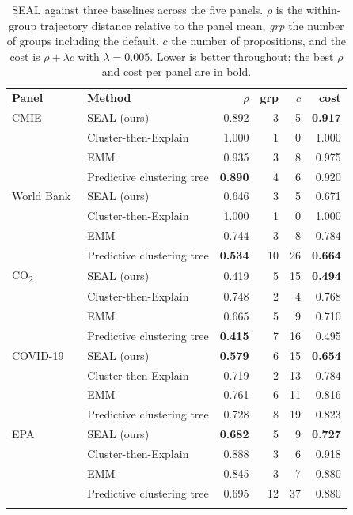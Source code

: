 \documentclass[runningheads]{llncs}
\begin{document}
\begin{table}[t]
\caption{\textsc{SEAL} against three baselines across the five panels. $\rho$ is the within-group trajectory distance relative to the panel mean, \emph{grp} the number of groups including the default, $c$ the number of propositions, and the cost is $\rho + \lambda c$ with $\lambda = 0.005$. Lower is better throughout; the best $\rho$ and cost per panel are in bold.}
\label{tab:baselines}
\centering
\footnotesize
\begin{tabular}{llrrrr}
\hline\noalign{\smallskip}
\textbf{Panel} & \textbf{Method} & $\rho$ & \textbf{grp} & $c$ & \textbf{cost} \\
\noalign{\smallskip}\hline\noalign{\smallskip}
CMIE~\citep{cmie}
  & \textsc{SEAL} (ours)        & 0.892 & 3  & 5  & \textbf{0.917} \\
  & Cluster-then-Explain        & 1.000 & 1  & 0  & 1.000 \\
  & EMM                         & 0.935 & 3  & 8  & 0.975 \\
  & Predictive clustering tree  & \textbf{0.890} & 4  & 6  & 0.920 \\
\noalign{\smallskip}\hline\noalign{\smallskip}
World Bank~\citep{worldbankwdi}
  & \textsc{SEAL} (ours)        & 0.646 & 3  & 5  & 0.671 \\
  & Cluster-then-Explain        & 1.000 & 1  & 0  & 1.000 \\
  & EMM                         & 0.744 & 3  & 8  & 0.784 \\
  & Predictive clustering tree  & \textbf{0.534} & 10 & 26 & \textbf{0.664} \\
\noalign{\smallskip}\hline\noalign{\smallskip}
CO\textsubscript{2}~\citep{owidco2}
  & \textsc{SEAL} (ours)        & 0.419 & 5  & 15 & \textbf{0.494} \\
  & Cluster-then-Explain        & 0.748 & 2  & 4  & 0.768 \\
  & EMM                         & 0.665 & 5  & 9  & 0.710 \\
  & Predictive clustering tree  & \textbf{0.415} & 7  & 16 & 0.495 \\
\noalign{\smallskip}\hline\noalign{\smallskip}
COVID-19~\citep{owidcovid}
  & \textsc{SEAL} (ours)        & \textbf{0.579} & 6  & 15 & \textbf{0.654} \\
  & Cluster-then-Explain        & 0.719 & 2  & 13 & 0.784 \\
  & EMM                         & 0.761 & 6  & 11 & 0.816 \\
  & Predictive clustering tree  & 0.728 & 8  & 19 & 0.823 \\
\noalign{\smallskip}\hline\noalign{\smallskip}
EPA~\citep{epaairdata}
  & \textsc{SEAL} (ours)        & \textbf{0.682} & 5  & 9  & \textbf{0.727} \\
  & Cluster-then-Explain        & 0.888 & 3  & 6  & 0.918 \\
  & EMM                         & 0.845 & 3  & 7  & 0.880 \\
  & Predictive clustering tree  & 0.695 & 12 & 37 & 0.880 \\
\noalign{\smallskip}\hline
\end{tabular}
\end{table}
\end{document}
